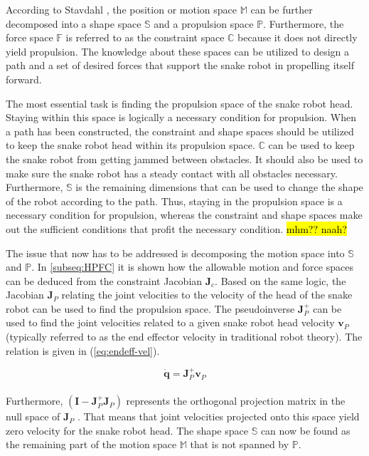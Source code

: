 According to Stavdahl \cite{StavdahlNote}, the position or motion space $\mathbb{M}$ can be further decomposed into a shape space $\mathbb{S}$ and a propulsion space $\mathbb{P}$. Furthermore, the force space $\mathbb{F}$ is referred to as the constraint space $\mathbb{C}$ because it does not directly yield propulsion. The knowledge about these spaces can be utilized to design a path and a set of desired forces that support the snake robot in propelling itself forward.

The most essential task is finding the propulsion space of the snake robot head. Staying within this space is logically a necessary condition for propulsion. When a path has been constructed, the constraint and shape spaces should be utilized to keep the snake robot head within its propulsion space. $\mathbb{C}$ can be used to keep the snake robot from getting jammed between obstacles. It should also be used to make sure the snake robot has a steady contact with all obstacles necessary. Furthermore, $\mathbb{S}$ is the remaining dimensions that can be used to change the shape of the robot according to the path. Thus, staying in the propulsion space is a necessary condition for propulsion, whereas the constraint and shape spaces make out the sufficient conditions that profit the necessary condition. \hl{mhm?? naah?}

The issue that now has to be addressed is decomposing the motion space into $\mathbb{S}$ and $\mathbb{P}$. In \ref{subseq:HPFC} it is shown how the allowable motion and force spaces can be deduced from the constraint Jacobian $\mathbf{J}_c$. Based on the same logic, the Jacobian $\mathbf{J}_P$ relating the joint velocities to the velocity of the head of the snake robot can be used to find the propulsion space. The pseudoinverse $\mathbf{J}^+_P$ can be used to find the joint velocities related to a given snake robot head velocity $\mathbf{v}_P$ (typically referred to as the end effector velocity in traditional robot theory). The relation is given in (\ref{eq:endeff-vel}).

\begin{equation}\label{eq:endeff-vel}
    \dot{\mathbf{q}} = \mathbf{J}^+_P \mathbf{v}_P
\end{equation}
\\
Furthermore, $(\mathbf{I} - \mathbf{J}^+_P \mathbf{J}_P)$ represents the orthogonal projection matrix in the null space of $\mathbf{J}_P$ \cite{chiaverini2008kinematically}. That means that joint velocities projected onto this space yield zero velocity for the snake robot head. The shape space $\mathbb{S}$ can now be found as the remaining part of the motion space $\mathbb{M}$ that is not spanned by $\mathbb{P}$.
